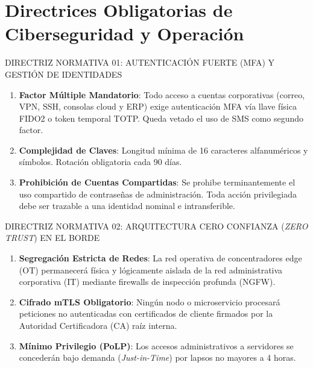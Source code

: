 \documentclass[11pt,letterpaper]{article}
\begin{document}
\vspace{0.4em}

\section{Directrices Obligatorias de Ciberseguridad y Operaci\'on}

\begin{corpdirective}{DIRECTRIZ NORMATIVA 01: AUTENTICACI\'ON FUERTE (MFA) Y GESTI\'ON DE IDENTIDADES}
  \begin{enumerate}[leftmargin=1.5em, itemsep=2pt, topsep=1pt]
    \item \textbf{Factor M\'ultiple Mandatorio}: Todo acceso a cuentas corporativas (correo, VPN, SSH, consolas cloud y ERP) exige autenticaci\'on MFA v\'ia llave f\'isica FIDO2 o token temporal TOTP. Queda vetado el uso de SMS como segundo factor.
    \item \textbf{Complejidad de Claves}: Longitud m\'inima de 16 caracteres alfanum\'ericos y s\'imbolos. Rotaci\'on obligatoria cada 90 d\'ias.
    \item \textbf{Prohibici\'on de Cuentas Compartidas}: Se prohibe terminantemente el uso compartido de contrase\~nas de administraci\'on. Toda acci\'on privilegiada debe ser trazable a una identidad nominal e intransferible.
  \end{enumerate}
\end{corpdirective}

\vspace{0.4em}

\begin{corpdirective}{DIRECTRIZ NORMATIVA 02: ARQUITECTURA CERO CONFIANZA (\textit{ZERO TRUST}) EN EL BORDE}
  \begin{enumerate}[leftmargin=1.5em, itemsep=2pt, topsep=1pt]
    \item \textbf{Segregaci\'on Estricta de Redes}: La red operativa de concentradores edge (OT) permanecer\'a f\'isica y l\'ogicamente aislada de la red administrativa corporativa (IT) mediante firewalls de inspecci\'on profunda (NGFW).
    \item \textbf{Cifrado mTLS Obligatorio}: Ning\'un nodo o microservicio procesar\'a peticiones no autenticadas con certificados de cliente firmados por la Autoridad Certificadora (CA) ra\'iz interna.
    \item \textbf{M\'inimo Privilegio (PoLP)}: Los accesos administrativos a servidores se conceder\'an bajo demanda (\textit{Just-in-Time}) por lapsos no mayores a 4 horas.
  \end{enumerate}
\end{corpdirective}
\end{document}

